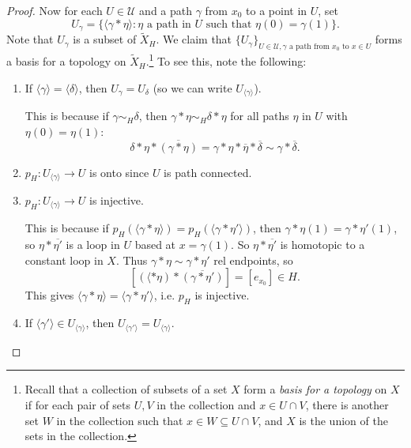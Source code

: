 \begin{proof}
  Now for each $U \in \mathcal{U}$ and a path
  $\gamma$ from $x_0 $ to a point in $U$, set
  \[
    U_{\gamma} = \{\langle \gamma * \eta \rangle : \eta \text{ a path in $U$ such that $\eta(0) = \gamma(1)$}\}.
  \]
  Note that $U_\gamma$ is a subset of $\widetilde{X}_H$.
  We claim that $\{U_\gamma\}_{U \in \mathcal{U}, \gamma \text{ a path from $x_0$ to $x \in U$}}$ forms a basis
  for a topology on $\widetilde{X}_H$.\footnote{Recall that a collection of subsets of a set $X$ form a \emph{basis for a topology} on $X$ if for each pair of sets $U, V$ in the collection and $x \in U \cap V$, there is another set $W$ in the collection such that $x \in W \subseteq U \cap V$, and $X$ is the union of the sets in the collection.} To see this, note the following:
  \begin{enumerate}
    \item If $\langle \gamma \rangle = \langle \delta \rangle$, then $U_\gamma = U_\delta$ (so we can write $U_{\langle \gamma \rangle}$).

      This is because if $\gamma \sim_H \delta$, then
      $\gamma * \eta \sim_H \delta * \eta$
      for all paths $\eta$ in $U$ with $\eta(0) = \eta(1)$:
      \[
        \delta * \eta * \overline{(\gamma * \eta)}
        = \gamma * \eta * \overline{\eta} * \overline{\delta}
        \sim \gamma * \overline{\delta}.
      \]
    \item $p_H : U_{\langle \gamma \rangle} \to U$ is
      onto since $U$ is path connected.
    \item $p_H : U_{\langle \gamma \rangle} \to U$ is injective.

      This is because if $p_H(\langle \gamma * \eta \rangle) = p_H(\langle \gamma * \eta' \rangle)$,
      then $\gamma * \eta(1) = \gamma * \eta'(1)$, so
      $\eta * \overline{\eta'}$ is a loop in $U$ based
      at $x = \gamma(1)$. So $\eta * \overline{\eta'}$ is
      homotopic to a constant loop in $X$. Thus
      $\gamma * \eta \sim \gamma * \eta'$ rel endpoints, so
      \[
        [(\langle * \eta) * \overline{(\gamma * \eta')}]
        = [e_{x_0}] \in H.
      \]
      This gives $\langle \gamma * \eta \rangle = \langle \gamma * \eta' \rangle$, i.e. $p_H$ is injective.
    \item If $\langle \gamma' \rangle \in U_{\langle \gamma \rangle}$, then
      $U_{\langle \gamma' \rangle} = U_{\langle \gamma \rangle}$.


\end{enumerate}
\end{proof}
